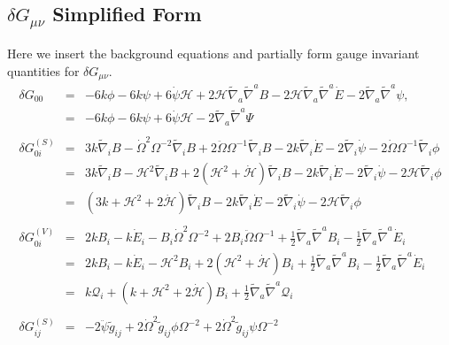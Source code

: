 \documentclass[10pt,letterpaper]{article}
\numberwithin{equation}{section}
\begin{document}
\begin{appendices}
\section{$\delta G_{\mu\nu}$ Simplified Form}
Here we insert the background equations and partially form gauge invariant quantities for $\delta G_{\mu\nu}$.
\begin{eqnarray}
\delta G_{00}&=&-6 k \phi
 - 6 k \psi
 + 6 \dot{\psi} \mathcal H
 + 2 \mathcal H \tilde\nabla_{a}\tilde\nabla^{a}B
 - 2 \mathcal H \tilde\nabla_{a}\tilde\nabla^{a}\dot{E}
 - 2 \tilde\nabla_{a}\tilde\nabla^{a}\psi,
\nonumber\\
&=& -6 k \phi- 6 k \psi + 6 \dot{\psi} \mathcal H - 2 \tilde\nabla_{a}\tilde\nabla^{a}\Psi
\nonumber\\ \nonumber\\
\delta  G^{(S)}_{0i}&=&3 k \tilde\nabla_{i}B
 -  \dot{\Omega}^2 \Omega^{-2} \tilde\nabla_{i}B
 + 2 \ddot{\Omega} \Omega^{-1} \tilde\nabla_{i}B
 - 2 k \tilde\nabla_{i}\dot{E}
 - 2 \tilde\nabla_{i}\dot{\psi}
 - 2 \dot{\Omega} \Omega^{-1} \tilde\nabla_{i}\phi
\nonumber\\
&=& 3 k \tilde\nabla_{i}B
 -  \mathcal H^2 \tilde\nabla_{i}B
 + 2 (\mathcal H^2 +\dot{\mathcal H}) \tilde\nabla_{i}B
 - 2 k \tilde\nabla_{i}\dot{E}
 - 2 \tilde\nabla_{i}\dot{\psi}
 - 2 \mathcal H \tilde\nabla_{i}\phi
\nonumber\\
&=& (3k+\mathcal H^2 +2\dot{\mathcal H})\tilde\nabla_i B  - 2 k \tilde\nabla_{i}\dot{E}
 - 2 \tilde\nabla_{i}\dot{\psi}
 - 2 \mathcal H \tilde\nabla_{i}\phi
\nonumber\\ \nonumber\\
\delta  G^{(V)}_{0i}&=&
2 k B_{i}
 -  k \dot{E}_{i}
 -  B_{i} \dot{\Omega}^2 \Omega^{-2}
 + 2 B_{i} \ddot{\Omega} \Omega^{-1}
 + \tfrac{1}{2} \tilde\nabla_{a}\tilde\nabla^{a}B_{i}
 -  \tfrac{1}{2} \tilde\nabla_{a}\tilde\nabla^{a}\dot{E}_{i}
\nonumber\\
&=& 
2 k B_{i}
 -  k \dot{E}_{i}
 -  \mathcal H^2 B_{i} 
 + 2(\mathcal H^2 + \dot{\mathcal H}) B_{i} 
 + \tfrac{1}{2} \tilde\nabla_{a}\tilde\nabla^{a}B_{i}
 -  \tfrac{1}{2} \tilde\nabla_{a}\tilde\nabla^{a}\dot{E}_{i}
\nonumber\\
&=& 
  k \mathcal Q_i
 + (k +\mathcal H^2 + 2\dot{\mathcal H}) B_{i} 
 + \tfrac{1}{2} \tilde\nabla_{a}\tilde\nabla^{a}\mathcal Q_{i}
\nonumber\\ \nonumber\\
\delta  G^{(S)}_{ij}&=&-2 \ddot{\psi} \tilde g_{ij}
 + 2 \dot{\Omega}^2 \tilde g_{ij} \phi \Omega^{-2}
 + 2 \dot{\Omega}^2 \tilde g_{ij} \psi \Omega^{-2}

\end{eqnarray}
\end{appendices}
\end{document}
